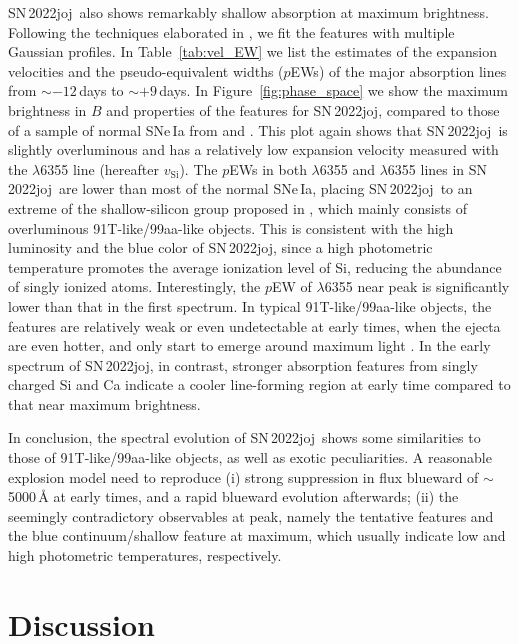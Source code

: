 \documentclass[twocolumn]{aastex631}
\newcommand{\sn}{SN\,2022joj}
\begin{document}
\begin{CJK*}{UTF8}{gbsn}
\sn\ also shows remarkably shallow  absorption at maximum brightness. Following the techniques elaborated in \citet{Liu_20jgb_2023}, we fit the  features with multiple Gaussian profiles. In Table~\ref{tab:vel_EW} we list the estimates of the expansion velocities and the pseudo-equivalent widths ($p$EWs) of the major absorption lines from $\sim$$-12$\,days to $\sim$$+9$\,days. In Figure~\ref{fig:phase_space} we show the maximum brightness in $B$ and properties of the  features for \sn, compared to those of a sample of normal SNe\,Ia from \citet{Zheng_2018} and \citet{Burrow_2020}. This plot again shows that \sn\ is slightly overluminous and has a relatively low expansion velocity measured with the  $\lambda$6355 line (hereafter $v_\mathrm{Si}$). The $p$EWs in both  $\lambda$6355 and  $\lambda$6355 lines in \sn\ are lower than most of the normal SNe\,Ia, placing \sn\ to an extreme of the shallow-silicon group proposed in \citet{Branch_2006}, which mainly consists of overluminous 91T-like/99aa-like objects. This is consistent with the high luminosity and the blue color of \sn, since a high photometric temperature promotes the average ionization level of Si, reducing the abundance of singly ionized atoms. Interestingly, the $p$EW of  $\lambda$6355 near peak is significantly lower than that in the first spectrum. In typical 91T-like/99aa-like objects, the  features are relatively weak or even undetectable at early times, when the ejecta are even hotter, and only start to emerge around maximum light \citep{Filippenko_91T_1992}. In the early spectrum of \sn, in contrast, stronger absorption features from singly charged Si and Ca indicate a cooler line-forming region at early time compared to that near maximum brightness. 

In conclusion, the spectral evolution of \sn\ shows some similarities to those of 91T-like/99aa-like objects, as well as exotic peculiarities. A reasonable explosion model need to reproduce (i) strong suppression in flux blueward of $\sim$5000\,\r{A} at early times, and a rapid blueward evolution afterwards; (ii) the seemingly contradictory observables at peak, namely the tentative  features and the blue continuum/shallow  feature at maximum, which usually indicate low and high photometric temperatures, respectively.

\section{Discussion} \label{sec:discussion}

\end{CJK*}
\end{document}
